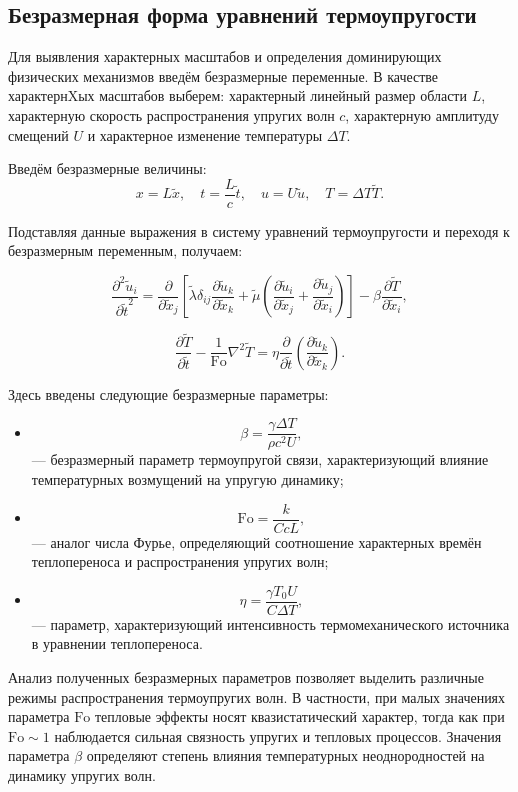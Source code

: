 \subsection{Безразмерная форма уравнений термоупругости}

Для выявления характерных масштабов и определения доминирующих физических механизмов введём безразмерные переменные. В качестве характернXых масштабов выберем:
характерный линейный размер области $L$, характерную скорость распространения упругих волн $c$, характерную амплитуду смещений $U$ и характерное изменение температуры $\Delta T$.

Введём безразмерные величины:
\begin{equation}
x = L \tilde{x}, \quad
t = \frac{L}{c} \tilde{t}, \quad
u = U \tilde{u}, \quad
T = \Delta T \tilde{T}.
\end{equation}

Подставляя данные выражения в систему уравнений термоупругости и переходя к безразмерным переменным, получаем:

\begin{equation}
\frac{\partial^2 \tilde{u}_i}{\partial \tilde{t}^2}
=
\frac{\partial}{\partial \tilde{x}_j}
\left[
\tilde{\lambda}
\delta_{ij}
\frac{\partial \tilde{u}_k}{\partial \tilde{x}_k}
+
\tilde{\mu}
\left(
\frac{\partial \tilde{u}_i}{\partial \tilde{x}_j}
+
\frac{\partial \tilde{u}_j}{\partial \tilde{x}_i}
\right)
\right]
-
\beta \frac{\partial \tilde{T}}{\partial \tilde{x}_i},
\end{equation}

\begin{equation}
\frac{\partial \tilde{T}}{\partial \tilde{t}}
-
\frac{1}{\mathrm{Fo}}
\nabla^2 \tilde{T}
=
\eta
\frac{\partial}{\partial \tilde{t}}
\left(
\frac{\partial \tilde{u}_k}{\partial \tilde{x}_k}
\right).
\end{equation}

Здесь введены следующие безразмерные параметры:

\begin{itemize}
  \item
  \[
  \beta = \frac{\gamma \Delta T}{\rho c^2 U},
  \]
  — безразмерный параметр термоупругой связи, характеризующий влияние температурных возмущений на упругую динамику;

  \item
  \[
  \mathrm{Fo} = \frac{k}{C c L},
  \]
  — аналог числа Фурье, определяющий соотношение характерных времён теплопереноса и распространения упругих волн;

  \item
  \[
  \eta = \frac{\gamma T_0 U}{C \Delta T},
  \]
  — параметр, характеризующий интенсивность термомеханического источника в уравнении теплопереноса.
\end{itemize}

Анализ полученных безразмерных параметров позволяет выделить различные режимы распространения термоупругих волн. В частности, при малых значениях параметра $\mathrm{Fo}$ тепловые эффекты носят квазистатический характер, тогда как при $\mathrm{Fo} \sim 1$ наблюдается сильная связность упругих и тепловых процессов. Значения параметра $\beta$ определяют степень влияния температурных неоднородностей на динамику упругих волн.
